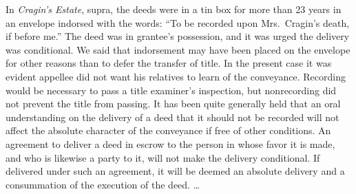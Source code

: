 In \textit{Cragin's Estate}, supra, the deeds were in a tin box for more than 23
years in an envelope indorsed with the words: ``To be recorded upon
Mrs.~Cragin's death, if before me.'' The deed was in grantee's possession, and
it was
urged the delivery was conditional. We said that indorsement may have been
placed on the envelope for other reasons than to defer the transfer of title.
In the present case it was evident appellee did not want his relatives to learn
of the conveyance. Recording would be necessary to pass a title examiner's
inspection, but nonrecording did not prevent the title from passing. It has
been quite generally held that an oral understanding on the delivery of a deed
that it should not be recorded will not affect the absolute character of the
conveyance if free of other conditions. An agreement to deliver a deed in escrow
to the person in whose favor it is made, and who is likewise a party to it,
will not make the delivery conditional. If delivered under such an agreement,
it will be deemed an absolute delivery and a consummation of the execution of
the deed. \dots

